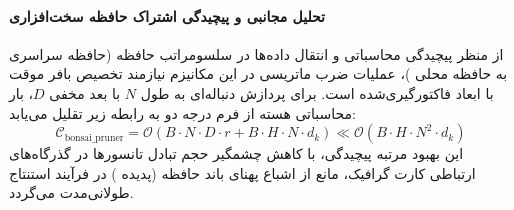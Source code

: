 \paragraph{تحلیل مجانبی و پیچیدگی اشتراک حافظه سخت‌افزاری}
از منظر پیچیدگی محاسباتی و انتقال داده‌ها در سلسومراتب حافظه (حافظه سراسری  به حافظه محلی )، عملیات ضرب ماتریسی در این مکانیزم نیازمند تخصیص بافر موقت با ابعاد فاکتورگیری‌شده است. برای پردازش دنباله‌ای به طول $N$ با بعد مخفی $D$، بار محاسباتی هسته از فرم درجه دو به رابطه زیر تقلیل می‌یابد:
\begin{equation}
\label{eq:complexity_bonsai_pruner}
\mathcal{C}_{\text{bonsai\_pruner}} = \mathcal{O}\left( B \cdot N \cdot D \cdot r + B \cdot H \cdot N \cdot d_k \right) \ll \mathcal{O}\left( B \cdot H \cdot N^2 \cdot d_k \right)
\end{equation}
این بهبود مرتبه پیچیدگی، با کاهش چشمگیر حجم تبادل تانسورها در گذرگاه‌های ارتباطی کارت گرافیک، مانع از اشباع پهنای باند حافظه (پدیده ) در فرآیند استنتاج طولانی‌مدت می‌گردد.
